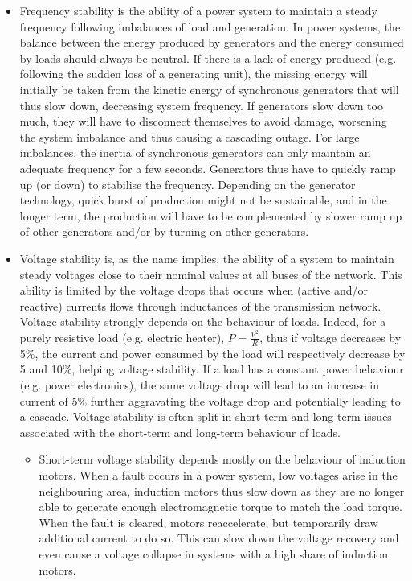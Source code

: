 \begin{itemize}
    \item Frequency stability is the ability of a power system to maintain a steady frequency following imbalances of load and generation. In power systems, the balance between the energy produced by generators and the energy consumed by loads should always be neutral. If there is a lack of energy produced (e.g. following the sudden loss of a generating unit), the missing energy will initially be taken from the kinetic energy of synchronous generators that will thus slow down, decreasing system frequency. If generators slow down too much, they will have to disconnect themselves to avoid damage, worsening the system imbalance and thus causing a cascading outage. For large imbalances, the inertia of synchronous generators can only maintain an adequate frequency for a few seconds. Generators thus have to quickly ramp up (or down) to stabilise the frequency. Depending on the generator technology, quick burst of production might not be sustainable, and in the longer term, the production will have to be complemented by slower ramp up of other generators and/or by turning on other generators.
    \item Voltage stability is, as the name implies, the ability of a system to maintain steady voltages close to their nominal values at all buses of the network. This ability is limited by the voltage drops that occurs when (active and/or reactive) currents flows through inductances of the transmission network. Voltage stability strongly depends on the behaviour of loads. Indeed, for a purely resistive load (e.g. electric heater), \(P = \frac{V^2}{R}\), thus if voltage decreases by 5\%, the current and power consumed by the load will respectively decrease by 5 and 10\%, helping voltage stability. If a load has a constant power behaviour (e.g. power electronics), the same voltage drop will lead to an increase in current of 5\% further aggravating the voltage drop and potentially leading to a cascade. Voltage stability is often split in short-term and long-term issues associated with the short-term and long-term behaviour of loads.
    \begin{itemize}
        \item Short-term voltage stability depends mostly on the behaviour of induction motors. When a fault occurs in a power system, low voltages arise in the neighbouring area, induction motors thus slow down as they are no longer able to generate enough electromagnetic torque to match the load torque. When the fault is cleared, motors reaccelerate, but temporarily draw additional current to do so. This can slow down the voltage recovery and even cause a voltage collapse in systems with a high share of induction motors.

\end{itemize}
\end{itemize}
